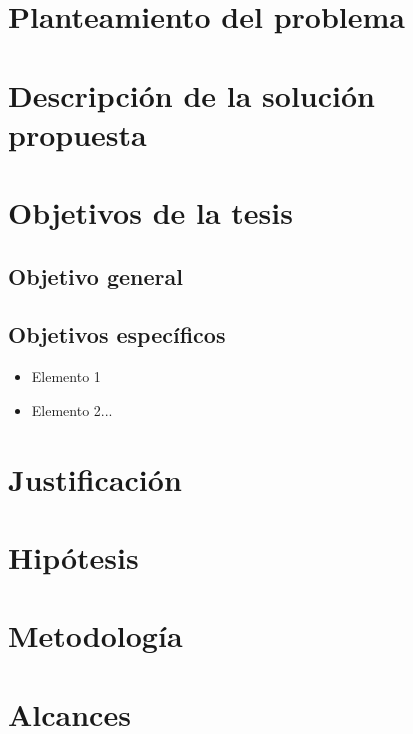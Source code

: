 \label{chap:intro}

\section{Planteamiento del problema}

    \lipsum[17]

\section{Descripción de la solución propuesta}

    \lipsum[17]

\section{Objetivos de la tesis}

    \subsection*{Objetivo general}
         
    \subsection*{Objetivos específicos}

        \begin{itemize}
            \item Elemento 1
            \item Elemento 2...
        \end{itemize}
    
\section{Justificación}

    \lipsum[17]

\section{Hipótesis}
    
    \lipsum[17]

\section{Metodología}

\section{Alcances}
    
